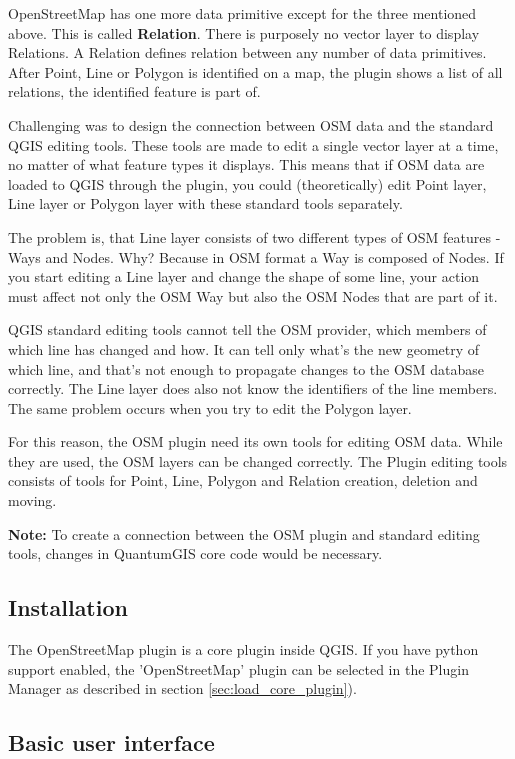 OpenStreetMap has one more data primitive except for the three mentioned
above. This is called \textbf{Relation}. There is purposely no vector layer
to display Relations. A Relation defines relation between any number of
data primitives. After Point, Line or Polygon is identified on a map,
the plugin shows a list of all relations, the identified feature is part of.

Challenging was to design the connection between OSM data and the
standard QGIS editing tools. These tools are made to edit a single vector
layer at a time, no matter of what feature types it displays. This means
that if OSM data are loaded to QGIS through the plugin, you could
(theoretically) edit Point layer, Line layer or Polygon layer with these
standard tools separately.

The problem is, that Line layer consists of two different types of OSM
features - Ways and Nodes. Why? Because in OSM format a Way is composed of
Nodes. If you start editing a Line layer and change the shape of some line,
your action must affect not only the OSM Way but also the OSM Nodes that
are part of it.

QGIS standard editing tools cannot tell the OSM provider, which members
of which line has changed and how. It can tell only what's the new geometry
of which line, and that's not enough to propagate changes to the OSM database
correctly. The Line layer does also not know the identifiers of the line
members. The same problem occurs when you try to edit the Polygon layer.

For this reason, the OSM plugin need its own tools for editing OSM data.
While they are used, the OSM layers can be changed correctly. The Plugin
editing tools consists of tools for Point, Line, Polygon and
Relation creation, deletion and moving.

\textbf{Note:} To create a connection between the OSM plugin and standard
editing tools, changes in QuantumGIS core code would be necessary.

\subsection{Installation}

The OpenStreetMap plugin is a core plugin inside QGIS. If you have python
support enabled, the 'OpenStreetMap' plugin can be selected in the Plugin
Manager as described in section \ref{sec:load_core_plugin}).

\subsection{Basic user interface}

